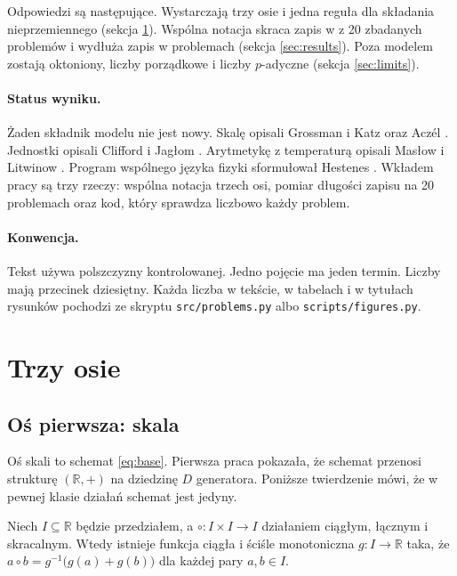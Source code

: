 \documentclass[11pt,a4paper]{article}
\begin{document}
Odpowiedzi są następujące. Wystarczają trzy osie i jedna reguła dla składania
nieprzemiennego (sekcja \ref{sec:axes}). Wspólna notacja skraca zapis
w \gcShorter{} z 20 zbadanych problemów i wydłuża zapis w \gcLonger{} problemach
(sekcja \ref{sec:results}). Poza modelem zostają oktoniony, liczby porządkowe
i liczby $p$-adyczne (sekcja \ref{sec:limits}).

\paragraph{Status wyniku.}
Żaden składnik modelu nie jest nowy. Skalę opisali Grossman i Katz
\cite{grossman1972} oraz Aczél \cite{aczel1966}. Jednostki opisali Clifford
\cite{clifford1878} i Jagłom \cite{yaglom1979}. Arytmetykę z temperaturą opisali
Masłow i Litwinow \cite{litvinov2007}. Program wspólnego języka fizyki
sformułował Hestenes \cite{hestenes2003}. Wkładem pracy są trzy rzeczy: wspólna
notacja trzech osi, pomiar długości zapisu na 20 problemach oraz kod, który
sprawdza liczbowo każdy problem.

\paragraph{Konwencja.}
Tekst używa polszczyzny kontrolowanej. Jedno pojęcie ma jeden termin. Liczby
mają przecinek dziesiętny. Każda liczba w tekście, w tabelach i w tytułach
rysunków pochodzi ze skryptu \texttt{src/problems.py} albo
\texttt{scripts/figures.py}.

\section{Trzy osie}
\label{sec:axes}

\subsection{Oś pierwsza: skala}

Oś skali to schemat \eqref{eq:base}. Pierwsza praca pokazała, że schemat
przenosi strukturę $(\mathbb{R},+)$ na dziedzinę $D$ generatora. Poniższe
twierdzenie mówi, że w pewnej klasie działań schemat jest jedyny.

\begin{theorem}
\label{thm:aczel}
Niech $I\subseteq\mathbb{R}$ będzie przedziałem, a $\circ\colon I\times I\to I$
działaniem ciągłym, łącznym i skracalnym. Wtedy istnieje funkcja ciągła
i ściśle monotoniczna $g\colon I\to\mathbb{R}$ taka, że
$a\circ b=g^{-1}\big(g(a)+g(b)\big)$ dla każdej pary $a, b\in I$.
\end{theorem}
\end{document}
